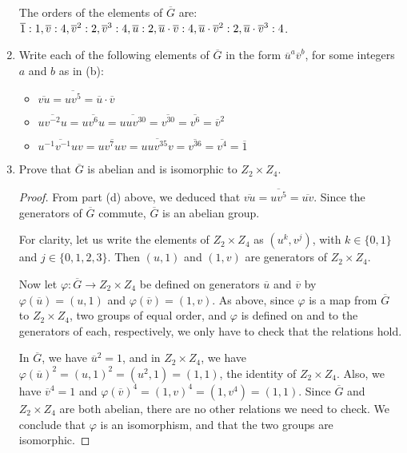 \documentclass{article}
\begin{document}
\begin{enumerate}[label=(\alph*), itemsep=0em]
          The orders of the elements of $\overline{G}$ are: $\overline{1}: 1, \overline{v}: 4, \overline{v}^2: 2, \overline{v}^3: 4, \overline{u}: 2, \\ \overline{u}\cdot\overline{v}: 4, \overline{u}\cdot\overline{v}^2: 2, \overline{u}\cdot\overline{v}^3: 4$.
    \item Write each of the following elements of $\overline{G}$ in the form $\overline{u}^a \overline{v}^b$, for some integers $a$ and $b$ as in (b):
        \begin{itemize}[itemsep=0em]
            \item $\overline{v u} = \overline{u v^5} = \overline{u} \cdot \overline{v}$
            \item $\overline{u v^{-2} u} = \overline{u v^6 u} = \overline{u u v^{30}} = \overline{v^{30}} = \overline{v^{6}} = \overline{v}^2$
            \item $\overline{u^{-1} v^{-1} u v} = \overline{u v^{7} u v} = \overline{u u v^{35} v} = \overline{v^{36}} = \overline{v^4} = \overline{1}$
        \end{itemize}
    \item Prove that $\overline{G}$ is abelian and is isomorphic to $Z_2 \times Z_4$.
        \begin{proof}
            From part (d) above, we deduced that $\overline{v u} = \overline{u v^5} = \overline{u v}$. Since the generators of $\overline{G}$ commute, $\overline{G}$ is an abelian group.

            For clarity, let us write the elements of $Z_2 \times Z_4$ as $(u^k, v^j)$, with $k \in \{ 0, 1 \}$ and $j \in \{ 0, 1, 2, 3 \}$. Then $(u, 1)$ and $(1, v)$ are generators of $Z_2 \times Z_4$.

            Now let $\varphi: \overline{G} \rightarrow Z_2 \times Z_4$ be defined on generators $\overline{u}$ and $\overline{v}$ by $\varphi(\overline{u}) = (u, 1)$ and $\varphi(\overline{v}) = (1, v)$. As above, since $\varphi$ is a map from $\overline{G}$ to $Z_2 \times Z_4$, two groups of equal order, and $\varphi$ is defined on and to the generators of each, respectively, we only have to check that the relations hold.

            In $\overline{G}$, we have $\overline{u}^2 = 1$, and in $Z_2 \times Z_4$, we have $\varphi(\overline{u})^2 = (u, 1)^2 = (u^2, 1) = (1, 1)$, the identity of $Z_2 \times Z_4$. Also, we have $\overline{v}^4 = 1$ and $\varphi(\overline{v})^4 = (1, v)^4 = (1, v^4) = (1, 1)$. Since $\overline{G}$ and $Z_2 \times Z_4$ are both abelian, there are no other relations we need to check. We conclude that $\varphi$ is an isomorphism, and that the two groups are isomorphic.
        \end{proof}
\end{enumerate}
\end{document}
